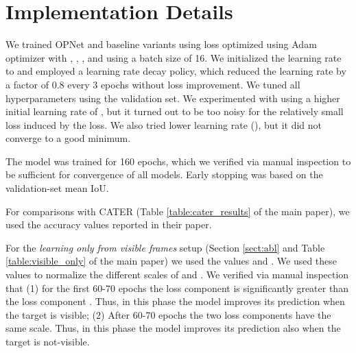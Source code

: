 \documentclass[]{llncs}
\begin{document}
\section{Implementation Details}\label{sec:implementation_details}
We trained OPNet and baseline variants using  loss optimized using Adam optimizer with , , , and using a batch size of 16. We initialized the learning rate to  and employed a learning rate decay policy, which reduced the learning rate by a factor of 0.8 every 3 epochs without loss improvement. We tuned all hyperparameters using the validation set. We experimented with using a higher initial learning rate of , but it turned out to be too noisy for the relatively small loss induced by the  loss. We also tried lower learning rate (), but it did not converge to a good minimum.

The model was trained for 160 epochs, which we verified via manual inspection to be sufficient for convergence of all models. Early stopping was based on the validation-set mean IoU.

For comparisons with CATER \cite{girdhar2019cater} (Table \ref{table:cater_results} of the main paper), we used the accuracy values reported in their paper. 

For the \textit{learning only from visible frames} setup (Section \ref{sect:abl} and Table \ref{table:visible_only} of the main paper) we used the values  and . We used these values to normalize the different scales of  and . We verified via manual inspection that (1) for the first 60-70 epochs the loss component  is significantly greater than the loss component . Thus, in this phase the model improves its prediction when the target is visible; (2) After 60-70 epochs the two loss components have the same scale. Thus, in this phase the model improves its prediction also when the target is not-visible. 
\end{document}

